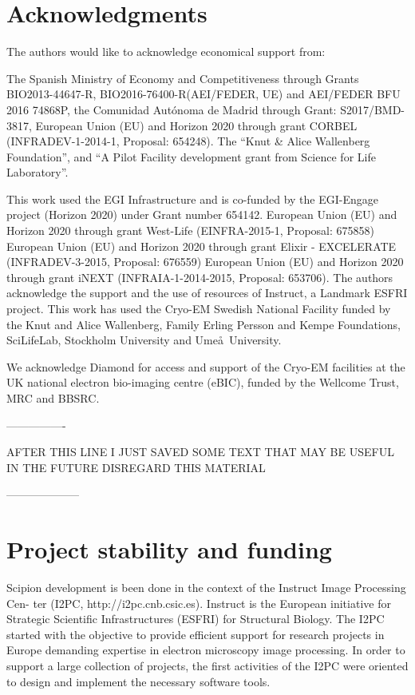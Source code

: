 \section{Acknowledgments}

The authors would like to acknowledge economical support from:

The Spanish Ministry of Economy and Competitiveness through Grants BIO2013-44647-R, BIO2016-76400-R(AEI/FEDER, UE) and AEI/FEDER BFU 2016 74868P, the Comunidad Aut\'{o}noma de Madrid through Grant: S2017/BMD-3817, European Union (EU) and Horizon 2020 through grant CORBEL (INFRADEV-1-2014-1, Proposal: 654248). The ``Knut \& Alice Wallenberg Foundation'', and ``A Pilot Facility development grant from Science for Life Laboratory''. 

This work used the EGI Infrastructure and is co-funded by the EGI-Engage project (Horizon 2020) under Grant number 654142. European Union (EU) and Horizon 2020 through grant West-Life (EINFRA-2015-1, Proposal: 675858) European Union (EU) and Horizon 2020 through grant Elixir - EXCELERATE (INFRADEV-3-2015, Proposal: 676559) European Union (EU) and Horizon 2020 through grant iNEXT (INFRAIA-1-2014-2015, Proposal: 653706). The authors acknowledge the support and the use of resources of Instruct, a Landmark ESFRI project. This work has used the Cryo-EM Swedish National Facility funded by the Knut and Alice Wallenberg, Family Erling Persson and Kempe Foundations, SciLifeLab, Stockholm University and Ume\aa\ University.

We acknowledge Diamond for access and support of the Cryo-EM facilities at the UK national electron bio-imaging centre (eBIC), funded by the Wellcome Trust, MRC and BBSRC.

----------------

    AFTER THIS LINE I JUST SAVED SOME TEXT THAT MAY BE USEFUL IN THE FUTURE DISREGARD THIS MATERIAL

    --------------------
   


\section{Project stability and funding}


Scipion development is been done in the context of the Instruct Image Processing Cen-
ter (I2PC, http://i2pc.cnb.csic.es). Instruct is the European initiative for Strategic
Scientific Infrastructures (ESFRI) for Structural Biology. The I2PC started with the objective 
to provide efficient support for research projects in Europe demanding expertise in 
electron microscopy image processing. In order to support a large collection
of projects, the first activities of the I2PC were oriented to design and implement the
necessary software tools. 

